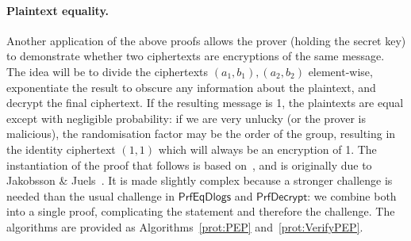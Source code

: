 \documentclass[12pt,a4paper]{article}
\theoremstyle{definition}
\begin{document}
\paragraph{Plaintext equality.}
Another application of the above proofs allows the prover (holding the secret key) to demonstrate whether two ciphertexts are encryptions of the same message. The idea will be to divide the ciphertexts $(a_1, b_1), (a_2, b_2)$ element-wise, exponentiate the result to obscure any information about the plaintext, and decrypt the final ciphertext. If the resulting message is 1, the plaintexts are equal except with negligible probability: if we are very unlucky (or the prover is malicious), the randomisation factor may be the order of the group, resulting in the identity ciphertext $(1, 1)$ which will always be an encryption of 1. The instantiation of the proof that follows is based on~\cite{mcmurtry2020test}, and is originally due to Jakobsson \& Juels~\cite{jakobsson2000mix}. It is made slightly complex because a stronger challenge is needed than the usual challenge in $\mathsf{PrfEqDlogs}$ and $\mathsf{PrfDecrypt}$: we combine both into a single proof, complicating the statement and therefore the challenge. The algorithms are provided as Algorithms~\ref{prot:PEP} and~\ref{prot:VerifyPEP}.
\end{document}
